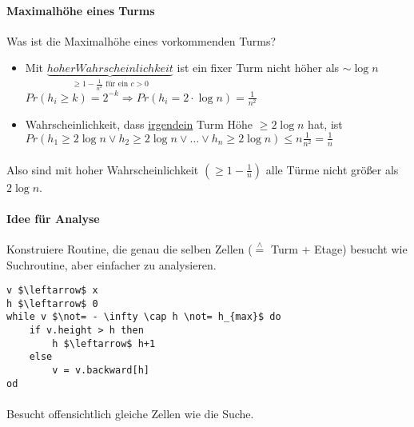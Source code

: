 \paragraph*{Maximalhöhe eines Turms} Was ist die Maximalhöhe eines vorkommenden Turms?
\begin{itemize}
	\item Mit $\underbrace{hoher Wahrscheinlichkeit}_{\geq 1 - \frac{1}{n^2} \text{ für ein } c>0}$
	ist ein fixer Turm nicht höher als $\sim \log n$
	$Pr(h_i \geq k) = 2^{-k} \Rightarrow Pr(h_i = 2 \cdot \log n) = \frac{1}{n^2}$
	\item Wahrscheinlichkeit, dass \underline{irgendein} Turm Höhe $\geq 2 \log n$ hat, ist $Pr(h_1 \geq 2 \log n \lor h_2 \geq 2 \log n \lor \dots \lor h_n \geq 2 \log n) \leq n \frac{1}{n^2} = \frac{1}{n}$
\end{itemize}


\paragraph*{} Also sind mit hoher Wahrscheinlichkeit $(\geq 1 - \frac{1}{n})$ alle Türme nicht größer als $2 \log n$.

\paragraph*{Idee für Analyse} Konstruiere Routine, die genau die selben Zellen ($\overset{\wedge}{=}$ Turm + Etage) besucht wie Suchroutine, aber einfacher zu analysieren.


\begin{lstlisting}[mathescape]
v $\leftarrow$ x
h $\leftarrow$ 0
while v $\not= - \infty \cap h \not= h_{max}$ do
	if v.height > h then
		h $\leftarrow$ h+1
	else
		v = v.backward[h]
od
\end{lstlisting}
\marginpar{\textcolor{blue}{\scriptsize $v.back-ward[h]$ Verweis auf Turm, der auf $v$ in Höhe $h$ zeigt}}

\paragraph*{} Besucht offensichtlich gleiche Zellen wie die Suche.

